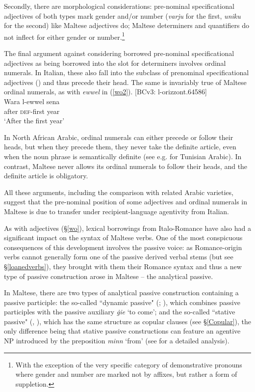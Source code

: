 \documentclass[output=paper]{langsci/langscibook}
\begin{document}
Secondly, there are morphological considerations: pre-nominal specificational adjectives of both types mark gender and/or number (\textit{varju} for the first, \textit{uniku} for the second) like Maltese adjectives do; Maltese determiners and quantifiers do not inflect for either gender or number.\footnote{With the exception of the very specific category of demonstrative pronouns where gender and number are marked not by affixes, but rather a form of suppletion.}

The final argument against considering borrowed pre-nominal specificational adjectives as being borrowed into the slot for determiners involves ordinal numerals. In Italian, these also fall into the subclass of prenominal specificational adjectives (\citealt[55]{italian2007}) and thus precede their head. The same is invariably true of Maltese ordinal numerals, as with \textit{ewwel} in (\ref{wo2}).
\ea\label{wo2} 
	{[BCv3: l-orizzont.64586]}\\
	\gll Wara l-ewwel sena\\
	after \textsc{def}-first year\\
	\glt `After the first year'\\
\z

In North African Arabic, ordinal numerals can either precede or follow their heads, but when they precede them, they never take the definite article, even when the noun phrase is semantically definite (see e.g. \citealt[284]{Ritt-Benmimoun2014} for Tunisian Arabic). In contrast, Maltese never allows its ordinal numerals to follow their heads, and the definite article is obligatory.

All these arguments, including the comparison with related Arabic varieties, suggest that the pre-nominal position of some adjectives and ordinal numerals in Maltese is due to transfer under recipient-language agentivity from Italian.

As with adjectives (§\ref{wo}), lexical borrowings from Italo-Romance have also had a significant impact on the syntax of Maltese verbs. One of the most conspicuous consequences of this development involves the passive voice: as Romance-origin verbs cannot generally form one of the passive derived verbal stems (but see §\ref{loanedverbs}), they brought with them their Romance syntax and thus a new type of passive construction arose in Maltese -- the analytical passive.

In Maltese, there are two types of analytical passive construction containing a passive participle: the so-called ``dynamic passive" (\citealt[321--324]{Vanhove1993}; \citealt[214]{BorgAzzopardi-Alexander1997}), which combines passive participles with the passive auxiliary \textit{ġie} `to come'; and the so-called ``stative passive" (\citealt[214]{BorgAzzopardi-Alexander1997}, \citealt[318--320]{Vanhove1993}), which has the same structure as copular clauses (see §\ref{Copular}), the only difference being that stative passive constructions can feature an agentive NP introduced by the preposition \textit{minn} `from' (see \citealt[104--107]{bulbul2018} for a detailed analysis).
\end{document}
